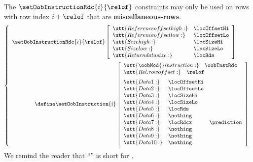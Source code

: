 \saNote{} The $\setOobInstructionRdc {i}{\relof}$ constraints may only be used on rows with row index $i + \relof$ that are \textbf{miscellaneous-rows}.
\[
        \left\{ \begin{array}{l}
                \setOobInstructionRdc {i}{\relof}
                \left[ \begin{array}{ll}
                        \utt{Reference offset high:}      & \locOffsetHi \\
                        \utt{Reference offset low:}       & \locOffsetLo \\
                        \utt{Size high:}                  & \locSizeHi   \\
                        \utt{Size low:}                   & \locSizeLo   \\
                        \utt{Return data size:}           & \locRds      \\
                \end{array} \right] \vspace{2mm} \\
                \qquad \qquad \define
                \setOobInstruction{i}
                \left[ \begin{array}{llr}
                        \multicolumn{3}{l}{\utt{\oobMod{} instruction:} \quad \oobInstRdc} \\
                        \multicolumn{3}{l}{\utt{Rel. row offset:}            \quad \relof}         \vspace{2mm} \\
			\utt{Data 1:}  & \locOffsetHi \\
                        \utt{Data 2:}  & \locOffsetLo \\
                        \utt{Data 3:}  & \locSizeHi   \\
                        \utt{Data 4:}  & \locSizeLo   \\
                        \utt{Data 5:}  & \locRds      \\
                        \utt{Data 6:}  & \nothing     \\
                        \utt{Data 7:}  & \locRdcx      & \prediction \\
                        \utt{Data 8:}  & \nothing     \\
                        \utt{Data 9:}  & \nothing     \\
                        \utt{Data 10:} & \nothing     \\
                \end{array} \right] \\
        \end{array} \right.
\]
\saNote{} We remind the reader that ``\rdcx'' is short for \rdcxSH{}.

